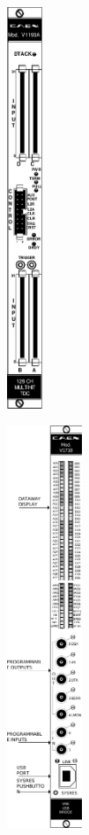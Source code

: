     \begin{figure}[H]
        \begin{subfigure}{0.5\linewidth}
		    \centering
			\includegraphics[height = 12cm]{fig/app1/V1190A-front.pdf}
			\caption{\label{fig:DAQSetup:A}}
		\end{subfigure}
		\begin{subfigure}{0.5\linewidth}
		    \centering
			\includegraphics[height = 12cm]{fig/app1/V1718-front.pdf}\\

\end{subfigure}
\end{figure}
